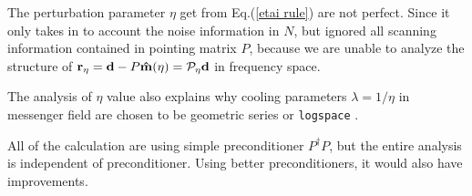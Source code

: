 \documentclass[twocolumn,linenumbers]{aastex631}
\newcommand{\vbd}{\vb{d}}
\newcommand{\hatm}{\vb{\hat{m}}}
\newcommand{\Pdagger}{P^{\dagger}}
\begin{document}
The perturbation parameter $\eta$ get from Eq.(\ref{etai rule}) are not
perfect. Since it only takes in to account the noise information in $N$,
but ignored all scanning information contained in pointing matrix $P$, because
we are unable to analyze the structure of
$\vb{r}_{\eta} = \vbd - P\hatm(\eta) = \mathcal{P}_{\eta} \vbd$ in frequency
space.

The analysis of $\eta$ value also explains why cooling parameters
$\lambda=1/\eta$ in messenger field are chosen to be geometric series or
\texttt{logspace} \cite{Huffenberger_2018}.

All of the calculation are using simple preconditioner $\Pdagger P$, but 
the entire analysis is independent of preconditioner.
Using better preconditioners, it would also have improvements.
















%


\end{document}
